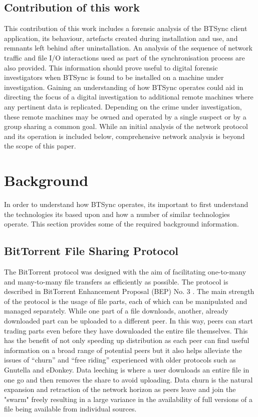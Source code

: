 \documentclass[final,5p,times,twocolumn]{elsarticle}
\begin{document}
\subsection{Contribution of this work}
\label{contribution}
This contribution of this work includes a forensic analysis of the BTSync client application, its behaviour, artefacts created during installation and use, and remnants left behind after uninstallation. An analysis of the sequence of network traffic and file I/O interactions used as part of the synchronisation process are also provided. This information should prove useful to digital forensic investigators when BTSync is found to be installed on a machine under investigation. Gaining an understanding of how BTSync operates could aid in directing the focus of a digital investigation to additional remote machines where any pertinent data is replicated. Depending on the crime under investigation, these remote machines may be owned and operated by a single suspect or by a group sharing a common goal. While an initial analysis of the network protocol and its operation is included below, comprehensive network analysis is beyond the scope of this paper.

\section{Background}
\label{background}


In order to understand how BTSync operates, its important to first understand the technologies its based upon and how a number of similar technologies operate. This section provides some of the required background information.

\subsection{BitTorrent File Sharing Protocol}
\label{bittorrent}

The BitTorrent protocol was designed with the aim of facilitating one-to-many and many-to-many file transfers as efficiently as possible. The protocol is described in BitTorrent Enhancement Proposal (BEP) No. 3 \cite{cohen2008bittorrent}. The main strength of the protocol is the usage of file parts, each of which can be manipulated and managed separately. While one part of a file downloads, another, already downloaded part can be uploaded to a different peer. In this way, peers can start trading parts even before they have downloaded the entire file themselves. This has the benefit of not only speeding up distribution as each peer can find useful information on a broad range of potential peers but it also helps alleviate the issues of ``churn'' \cite{Stutzbach:2006:UCP:1177080.1177105} and ``free riding'' \cite{4797943} experienced with older protocols such as Gnutella and eDonkey. Data leeching is where a user downloads an entire file in one go and then removes the share to avoid uploading. Data churn is the natural expansion and retraction of the network horizon as peers leave and join the "swarm" freely resulting in a large variance in the availability of full versions of a file being available from individual sources.
\end{document}
